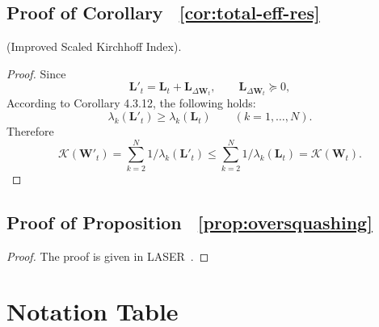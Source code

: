 \documentclass{article}
\theoremstyle{plain}
\theoremstyle{definition}
\theoremstyle{remark}
\begin{document}
\subsection{Proof of Corollary ~\ref{cor:total-eff-res}} (Improved Scaled Kirchhoff Index).
\begin{proof}
Since
\[
\mathbf{L}'_t=\mathbf{L}_t+\mathbf{L}_{\Delta\mathbf{W}_t},
\qquad
\mathbf{L}_{\Delta\mathbf{W}_t}\succeq 0,
\]
According to Corollary 4.3.12\cite{Horn_Johnson_1985}, the following holds:
\[
\lambda_k(\mathbf{L}'_t)\ge \lambda_k(\mathbf{L}_t)
\qquad (k=1,\dots,N).
\]
Therefore
\[
\mathcal{K}(\mathbf{W}'_t)
=
\sum_{k=2}^N 1/ \lambda_k(\mathbf{L}'_t)
\le
\sum_{k=2}^N 1/ \lambda_k(\mathbf{L}_t)
=
\mathcal{K}(\mathbf{W}_t).
\]
\end{proof}

\subsection{Proof of Proposition ~\ref{prop:oversquashing}}


\begin{proof}
The proof is given in  LASER~\cite{barbero2024laser}.
\end{proof}

\section{Notation Table}
\label{app:notation}
\end{document}
